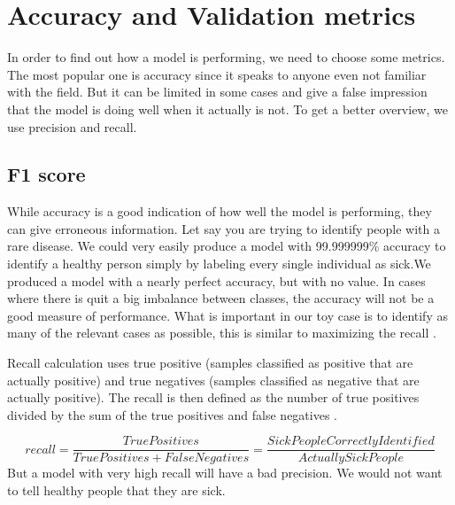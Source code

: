 \section{Accuracy and Validation metrics}
In order to find out how a model is performing, we need to choose some metrics. The most popular one is accuracy since it speaks to anyone even not familiar with the field. But it can be limited in some cases and give a false impression that the model is doing well when it actually is not. To get a better overview, we use precision and recall. 

\subsection{F1 score}
While accuracy is a good indication of how well the model is performing, they can give erroneous information. Let say you are trying to identify people with a rare disease. We could very easily produce a model with 99.999999\% accuracy to identify a healthy person simply by labeling every single individual as sick.We produced a model with a nearly perfect accuracy, but with no value. In cases where there is quit a big imbalance between classes, the accuracy will not be a good measure of performance.
What is important in our toy case is to identify as many of the relevant cases as possible, this is similar to maximizing the recall \cite{multimetrics}. 

Recall calculation uses true positive (samples classified as positive that are actually positive) and true negatives (samples classified as negative that are actually positive). The recall is then defined as the number of true positives divided by the sum of the true positives and false negatives \cite{metrics}. 


\[recall = \frac{True Positives}{True Positives + False Negatives} = \frac{Sick People Correctly Identified}{Actually Sick People}\]
But a model with very high recall will have a bad precision. We would not want to tell healthy people that they are sick. 

